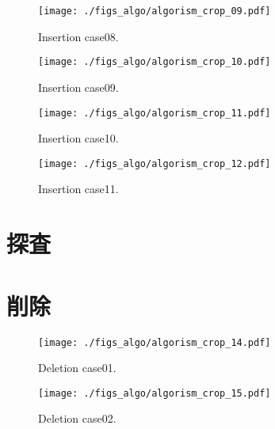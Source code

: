 \begin{figure}[h]
  \vspace{-0.5cm}
  \texttt{[image: ./figs\_algo/algorism\_crop\_09.pdf]}
  \caption{
    Insertion case08.
  }
  \label{fig_IpCHashT_insert_hard_case07}
  \vspace{-0.5cm}
\end{figure}

\begin{figure}[h]
  \vspace{-0.5cm}
  \texttt{[image: ./figs\_algo/algorism\_crop\_10.pdf]}
  \caption{
    Insertion case09.
  }
  \label{fig_IpCHashT_insert_hard_case09}
  \vspace{-0.5cm}
\end{figure}

\begin{figure}[h]
  \vspace{-0.5cm}
  \texttt{[image: ./figs\_algo/algorism\_crop\_11.pdf]}
  \caption{
    Insertion case10.
  }
  \label{fig_IpCHashT_insert_hard_case08}
  \vspace{-0.5cm}
\end{figure}

\begin{figure}[h]
  \vspace{-0.5cm}
  \texttt{[image: ./figs\_algo/algorism\_crop\_12.pdf]}
  \caption{
    Insertion case11.
  }
  \label{fig_IpCHashT_insert_hard_case10}
  \vspace{-0.5cm}
\end{figure}





\section{探査}


\section{削除}
\begin{figure}[h]
  \vspace{-0.5cm}
  \texttt{[image: ./figs\_algo/algorism\_crop\_14.pdf]}
  \caption{
    Deletion case01.
  }
  \label{fig_IpCHashT_deletion_case01}
  \vspace{-0.5cm}
\end{figure}

\begin{figure}[h]
  \vspace{-0.5cm}
  \texttt{[image: ./figs\_algo/algorism\_crop\_15.pdf]}
  \caption{
    Deletion case02.
  }
  \label{fig_IpCHashT_deletion_case02}
  \vspace{-0.5cm}
\end{figure}

